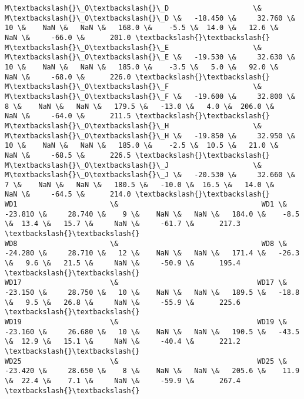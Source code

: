 \documentclass{article}
\begin{document}
\begin{Verbatim}[commandchars=\\\{\}]
M\textbackslash{}\_O\textbackslash{}\_D                    \&                                M\textbackslash{}\_O\textbackslash{}\_D \&   -18.450 \&     32.760 \&   10 \&    NaN \&   NaN \&   168.0 \&    -5.5 \&  14.0 \&   12.6 \&     NaN \&     -66.0 \&      201.0 \textbackslash{}\textbackslash{}
M\textbackslash{}\_O\textbackslash{}\_E                    \&                                M\textbackslash{}\_O\textbackslash{}\_E \&   -19.530 \&     32.630 \&   10 \&    NaN \&   NaN \&   185.0 \&    -3.5 \&   5.0 \&   92.0 \&     NaN \&     -68.0 \&      226.0 \textbackslash{}\textbackslash{}
M\textbackslash{}\_O\textbackslash{}\_F                    \&                                M\textbackslash{}\_O\textbackslash{}\_F \&   -19.600 \&     32.800 \&    8 \&    NaN \&   NaN \&   179.5 \&   -13.0 \&   4.0 \&  206.0 \&     NaN \&     -64.0 \&      211.5 \textbackslash{}\textbackslash{}
M\textbackslash{}\_O\textbackslash{}\_H                    \&                                M\textbackslash{}\_O\textbackslash{}\_H \&   -19.850 \&     32.950 \&   10 \&    NaN \&   NaN \&   185.0 \&    -2.5 \&  10.5 \&   21.0 \&     NaN \&     -68.5 \&      226.5 \textbackslash{}\textbackslash{}
M\textbackslash{}\_O\textbackslash{}\_J                    \&                                M\textbackslash{}\_O\textbackslash{}\_J \&   -20.530 \&     32.660 \&    7 \&    NaN \&   NaN \&   180.5 \&   -10.0 \&  16.5 \&   14.0 \&     NaN \&     -64.5 \&      214.0 \textbackslash{}\textbackslash{}
WD1                      \&                                  WD1 \&   -23.810 \&     28.740 \&    9 \&    NaN \&   NaN \&   184.0 \&    -8.5 \&  13.4 \&   15.7 \&     NaN \&     -61.7 \&      217.3 \textbackslash{}\textbackslash{}
WD8                      \&                                  WD8 \&   -24.280 \&     28.710 \&   12 \&    NaN \&   NaN \&   171.4 \&   -26.3 \&   9.6 \&   21.5 \&     NaN \&     -50.9 \&      195.4 \textbackslash{}\textbackslash{}
WD17                     \&                                 WD17 \&   -23.150 \&     28.750 \&   10 \&    NaN \&   NaN \&   189.5 \&   -18.8 \&   9.5 \&   26.8 \&     NaN \&     -55.9 \&      225.6 \textbackslash{}\textbackslash{}
WD19                     \&                                 WD19 \&   -23.160 \&     26.680 \&   10 \&    NaN \&   NaN \&   190.5 \&   -43.5 \&  12.9 \&   15.1 \&     NaN \&     -40.4 \&      221.2 \textbackslash{}\textbackslash{}
WD25                     \&                                 WD25 \&   -23.420 \&     28.650 \&    8 \&    NaN \&   NaN \&   205.6 \&    11.9 \&  22.4 \&    7.1 \&     NaN \&     -59.9 \&      267.4 \textbackslash{}\textbackslash{}

\end{Verbatim}
\end{document}
